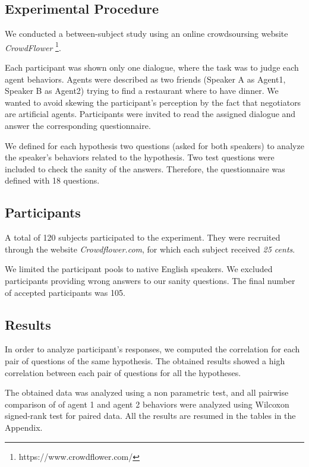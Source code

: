 \documentclass{llncs}
\begin{document}
				\subsection{Experimental Procedure}
				
				We conducted a between-subject study using an online crowdsoursing website \emph{CrowdFlower} \footnote{https://www.crowdflower.com/}. 
				
				
				Each participant was shown only one dialogue, where the task was to judge each agent behaviors. Agents were described as two friends (Speaker A as Agent1, Speaker B as Agent2) trying to find a restaurant where to have dinner. We wanted to avoid skewing the participant's perception by the fact that negotiators are artificial agents. Participants were invited to read the assigned dialogue and answer the corresponding questionnaire. 
				
				We defined for each hypothesis two questions (asked for both speakers) to analyze the speaker's behaviors related to the hypothesis. 
				Two test questions were included to check the sanity of the answers. Therefore, the questionnaire was defined with 18 questions.
				
				\subsection{Participants}
				A total of 120 subjects participated to the experiment. They were recruited through the website \emph{Crowdflower.com}, for which each subject received \textit{25 cents}. 
				
				We limited the participant pools to native English speakers. We excluded participants providing wrong answers to our sanity questions. The final number of accepted participants was 105. 
				
				\subsection{Results}
				 In order to analyze participant's responses, we computed the correlation for each pair of questions of the same hypothesis. The obtained results showed a high correlation between each pair of questions for all the hypotheses.
				
				The obtained data was analyzed using a non parametric test, and all pairwise comparison of of agent 1 and agent 2 behaviors were analyzed using Wilcoxon signed-rank test for paired data. All the results are resumed in the tables in the Appendix.
				
\end{document}
